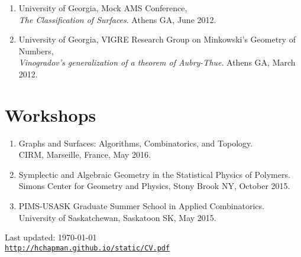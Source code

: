 \documentclass[letterpaper]{article}
\def\footerlink{http://hchapman.github.io/static/CV.pdf}
\begin{document}
\begin{enumerate}
\item University of Georgia, Mock AMS Conference, \\
  \textit{The Classification of Surfaces}. Athens GA, June 2012.
  
\item University of Georgia, VIGRE Research Group on Minkowski's Geometry of Numbers, \\
  \textit{Vinogradov's generalization of a theorem of Aubry-Thue}. Athens GA, March 2012.

\end{enumerate}


\section*{Workshops}
\begin{enumerate}
\item Graphs and Surfaces: Algorithms, Combinatorics, and Topology. \\
  CIRM, Marseille, France, May 2016.
\item Symplectic and Algebraic Geometry in the Statistical Physics of Polymers. \\
  Simons Center for Geometry and Physics, Stony Brook NY, October 2015. 
\item PIMS-USASK Graduate Summer School in Applied Combinatorics. \\
  University of Saskatchewan, Saskatoon SK, May 2015.
\end{enumerate}

\bigskip

\begin{center}
  \begin{footnotesize}
    Last updated: \today \\
    \href{\footerlink}{\texttt{\footerlink}}
  \end{footnotesize}
\end{center}
\end{document}
